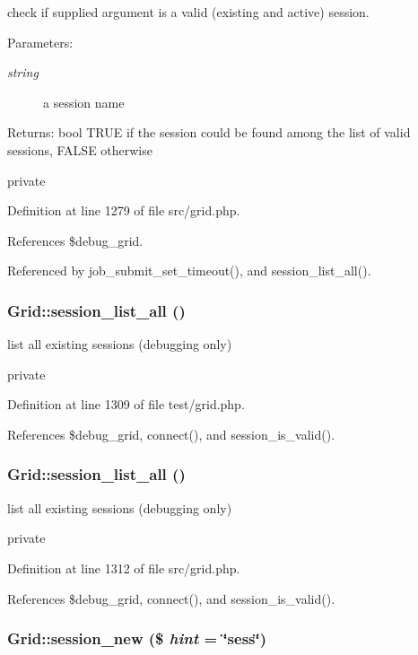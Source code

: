 check if supplied argument is a valid (existing and active) session. 

\begin{Desc}
\item[Parameters:]
\begin{description}
\item[{\em string}]a session name \end{description}
\end{Desc}
\begin{Desc}
\item[Returns:]bool TRUE if the session could be found among the list of valid sessions, FALSE otherwise\end{Desc}
private 

Definition at line 1279 of file src/grid.php.

References \$debug\_\-grid.

Referenced by job\_\-submit\_\-set\_\-timeout(), and session\_\-list\_\-all().
\subsubsection{\setlength{\rightskip}{0pt plus 5cm}Grid::session\_\-list\_\-all ()}\label{classGrid_a43}


list all existing sessions (debugging only) 

private 

Definition at line 1309 of file test/grid.php.

References \$debug\_\-grid, connect(), and session\_\-is\_\-valid().
\subsubsection{\setlength{\rightskip}{0pt plus 5cm}Grid::session\_\-list\_\-all ()}\label{classGrid_a17}


list all existing sessions (debugging only) 

private 

Definition at line 1312 of file src/grid.php.

References \$debug\_\-grid, connect(), and session\_\-is\_\-valid().
\subsubsection{\setlength{\rightskip}{0pt plus 5cm}Grid::session\_\-new (\$ {\em hint} = \char`\"{}sess\char`\"{})}\label{classGrid_a39}



